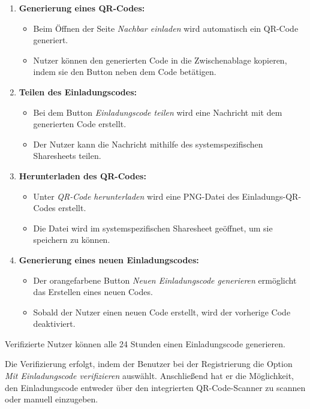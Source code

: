\begin{enumerate}[label=\arabic*.]
  \item \textbf{Generierung eines QR-Codes:}
        \begin{itemize}
          \item Beim Öffnen der Seite \textit{Nachbar einladen} wird automatisch ein QR-Code generiert.
          \item Nutzer können den generierten Code in die Zwischenablage kopieren, indem sie den Button neben dem Code betätigen.
        \end{itemize}

  \item \textbf{Teilen des Einladungscodes:}
        \begin{itemize}
          \item Bei dem Button \textit{Einladungscode teilen} wird eine Nachricht mit dem generierten Code erstellt.
          \item Der Nutzer kann die Nachricht mithilfe des systemspezifischen Sharesheets teilen.
        \end{itemize}

  \item \textbf{Herunterladen des QR-Codes:}
        \begin{itemize}
          \item Unter \textit{QR-Code herunterladen} wird eine PNG-Datei des Einladungs-QR-Codes erstellt.
          \item Die Datei wird im systemspezifischen Sharesheet geöffnet, um sie speichern zu können.
        \end{itemize}

  \item \textbf{Generierung eines neuen Einladungscodes:}
        \begin{itemize}
          \item Der orangefarbene Button \textit{Neuen Einladungscode generieren} ermöglicht das Erstellen eines neuen Codes.
          \item Sobald der Nutzer einen neuen Code erstellt, wird der vorherige Code deaktiviert.
        \end{itemize}
\end{enumerate}

Verifizierte Nutzer können alle 24 Stunden einen
Einladungscode generieren.

Die Verifizierung erfolgt, indem der Benutzer bei der
Registrierung die Option \textit{Mit Einladungscode verifizieren}
auswählt. Anschließend hat er die Möglichkeit, den
Einladungscode entweder über den integrierten
QR-Code-Scanner zu scannen oder manuell einzugeben.


